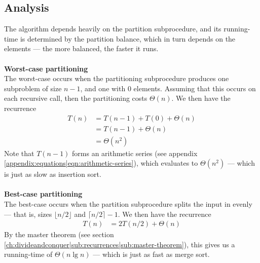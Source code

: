 \subsection{Analysis}
The algorithm depends heavily on the partition subprocedure, and its
running-time is determined by the partition balance, which in turn depends on
the elements --- the more balanced, the faster it runs.
\\\\
\noindent \textbf{Worst-case partitioning} \\
The worst-case occurs when the partitioning subprocedure produces one
subproblem of size $n - 1$, and one with $0$ elements. Assuming that this
occurs on each recursive call, then the partitioning costs $\Theta(n)$. We
then have the recurrence
\begin{align}
	T(n) &= T(n-1) + T(0) + \Theta(n) \\ &= T(n-1) + \Theta(n) \\ &= \Theta(n^2)
\end{align}
Note that $T(n-1)$ forms an arithmetic series (see appendix
\ref{appendix:equations|eqn:arithmetic-series}), which evaluates to
$\Theta(n^2)$ --- which is just as slow as insertion sort.
\\\\
\noindent \textbf{Best-case partitioning} \\
The best-case occurs when the partition subprocedure splits the input in
evenly --- that is, sizes $\lfloor n/2 \rfloor$ and $\lceil n/2 \rceil - 1$.
We then have the recurrence
\begin{align}
	T(n) &= 2T(n/2) + \Theta(n)
\end{align}
By the master theorem (see section
\ref{ch:divideandconquer|sub:recurrences|sub:master-theorem}), this gives us a
running-time of $\Theta(n \lg n)$ --- which is just as fast as merge sort.

